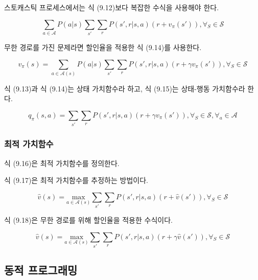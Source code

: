 \documentclass [12pt] {oblivoir}
\let\oldsubsubsection=\subsubsection
\renewcommand{\subsubsection}
{
  \filbreak
  \oldsubsubsection
}
\begin{document}
스토캐스틱 프로세스에서는 식 (9.12)보다 복잡한 수식을 사용해야 한다.

\begin{equation} \tag{9.12}
  \sum_{a \in \mathcal{A}} P(a \vert s)\sum_{s'}\sum_{r}P(s', r \vert s, a)(r + v_{\pi}(s')), \forall_{S} \in \mathcal{S}
\end{equation}

무한 경로를 가진 문제라면 할인율을 적용한 식 (9.14)를 사용한다.

\begin{equation} \tag{9.14}
  v_{\pi}(s) = \sum_{a \in \mathcal{A}(s)}P(a \vert s)\sum_{s'}\sum_{r}P(s', r \vert s, a)(r + \gamma v_{\pi}(s')), \forall_{S} \in \mathcal{S}
\end{equation}

식 (9.13)과 식 (9.14)는 상태 가치함수라 하고, 식 (9.15)는 상태-행동 가치함수라 한다.

\begin{equation} \tag{9.15}
  q_{\pi}(s, a) = \sum_{s'}\sum_{r}P(s', r \vert s, a)(r + \gamma v_{\pi}(s')), \forall_{S} \in \mathcal{S}, \forall_{a} \in \mathcal{A}
\end{equation}

\vspace{3mm}

\subsubsection{최적 가치함수}

식 (9.16)은 최적 가치함수를 정의한다.

식 (9.17)은 최적 가치함수를 추정하는 방법이다.

\begin{equation} \tag{9.17}
  \hat{v}(s) = \underset{a \in \mathcal{A}(s)}{\mathrm{max}}\sum_{s'}\sum_{r}P(s', r \vert s, a)(r + \hat{v}(s')), \forall_{S} \in \mathcal{S}
\end{equation}

식 (9.18)은 무한 경로를 위해 할인율을 적용한 수식이다.

\begin{equation} \tag{9.18}
  \hat{v}(s) = \underset{a \in \mathcal{A}(s)}{\mathrm{max}}\sum_{s'}\sum_{r}P(s', r \vert s, a)(r + \gamma \hat{v}(s')), \forall_{S} \in \mathcal{S}
\end{equation}

\subsection{동적 프로그래밍}
\end{document}

